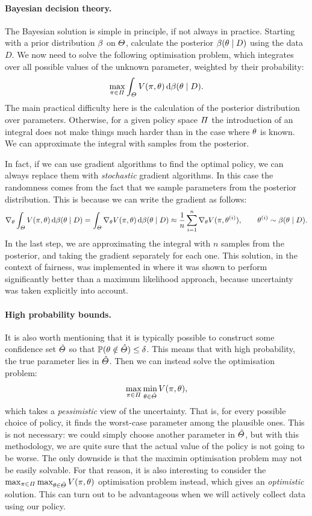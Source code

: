 {  \paragraph{Bayesian decision theory.} The Bayesian solution is simple in principle, if not always in practice. Starting with a prior distribution $\beta$ on $\Theta$, calculate the posterior $\beta(\theta \mid D)$ using the data $D$. We now need to solve the following optimisation problem, which integrates over all possible values of the unknown parameter, weighted by their probability:
  \[
    \max_{\pi \in \Pi} \int_\Theta V(\pi, \theta) \,\mathrm{d} \beta(\theta \mid D).
  \]
  The main practical difficulty here is the calculation of the posterior distribution over parameters. Otherwise, for a given policy space $\Pi$ the introduction of an integral does not make things much harder than in the case where $\theta$ is known. We can approximate the integral with samples from the posterior.

  In fact, if we can use gradient algorithms to find the optimal policy, we can always replace them with \emph{stochastic} gradient algorithms. In this case the randomness comes from the fact that we sample parameters from the posterior distribution. This is because we can write the gradient as follows:
  \[
    \nabla_\theta \int_\Theta V(\pi, \theta) \,\mathrm{d} \beta(\theta \mid D)
    =
    \int_\Theta \nabla_\theta V(\pi, \theta) \,\mathrm{d} \beta(\theta \mid D)
    \approx
    \frac{1}{n} \sum_{i=1}^n \nabla_\theta V(\pi, \theta^{(i)}), \qquad \theta^{(i)} \sim \beta(\theta \mid D).
  \]
  In the last step, we are approximating the integral with $n$ samples from the posterior, and taking the gradient separately for each one. This solution, in the context of fairness, was implemented in \citep{dimitrakakis2017:subjective-fairness} where it was shown to perform significantly better than a maximum likelihood approach, because uncertainty was taken explicitly into account.

  \paragraph{High probability bounds.} It is also worth mentioning that it is typically possible to construct some confidence set $\hat{\Theta}$ so that $\mathop{\mbox{\ensuremath{\mathbb{P}}}}\nolimits(\theta \notin \hat{\Theta}) \leq \delta$. This means that with high probability, the true parameter lies in $\hat{\Theta}$. Then we can instead solve the optimisation problem:
  \[
    \max_{\pi \in \Pi} \min_{\theta \in \hat{\Theta}} V(\pi, \theta),
  \]
  which takes a \emph{pessimistic} view of the uncertainty. That is, for every possible choice of policy, it finds the worst-case parameter among the plausible ones. This is not necessary: we could simply choose another parameter in $\hat{\Theta}$, but with this methodology, we are quite sure that the actual value of the policy is not going to be worse. The only downside is that the maximin optimisation problem may not be easily solvable. For that reason, it is also interesting to consider the $\max_{\pi \in \Pi} \max_{\theta \in \hat{\Theta}} V(\pi, \theta)$ optimisation problem instead, which gives an \emph{optimistic} solution. This can turn out to be advantageous when we will actively collect data using our policy.
}

